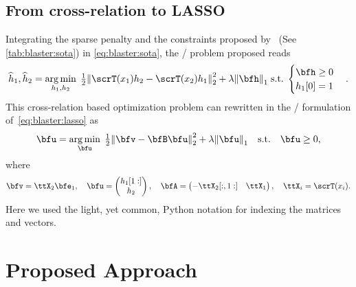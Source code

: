 \subsection{From cross-relation to LASSO}\label{subsec:blaster:xrel_lasso}
Integrating the sparse penalty and the constraints proposed by~ (See \cref{tab:blaster:sota}) in \cref{eq:blaster:sota},
the \BSNdef/ problem proposed reads
\begin{equation}\label{eq:blaster:bsn}
    \disFilterHat_1, \disFilterHat_2
    =
    \kargmin_{\disFilter_1, \disFilter_2}
    \;
    \tfrac{1}{2}
    \kvvbar{
        \scrT(\disRecordedSignal_1) \disFilter_2
        -
        \scrT(\disRecordedSignal_2) \disFilter_1
    }_2^2
    + \lambda\kvvbar{\bfh}_1
    \;\text{s.t.}\;
    \begin{cases}
        \bfh \geq 0\\
        h_1[0] = 1
    \end{cases}
    .
\end{equation}
This cross-relation based optimization problem can rewritten in the \LASSO/ formulation of~\cref{eq:blaster:lasso} as
\begin{equation*}
    \bfu
    =
    \kargmin_{\bfu}
    \;
    \tfrac{1}{2}
    \kvvbar{ \bfv - \bfB \bfu }_2^2
    + \lambda\kvvbar{\bfu}_1
    \quad\text{s.t.}\quad
    \bfu \geq 0
    ,
\end{equation*}
where
\begin{equation*}
    \bfv = \ttX_2\bfe_1,
    \quad
    \bfu =
    \begin{pmatrix}
        h_1[1:] \\
        h_2
    \end{pmatrix},
    \quad
    \bfA =
    \begin{pmatrix}
        -\ttX_2[:, 1:] & \ttX_1
    \end{pmatrix},
    \quad
    \ttX_i = \scrT(x_i)
    .
\end{equation*}
Here we used the light, yet common, Python notation for indexing the matrices and vectors.

\section{Proposed Approach}
